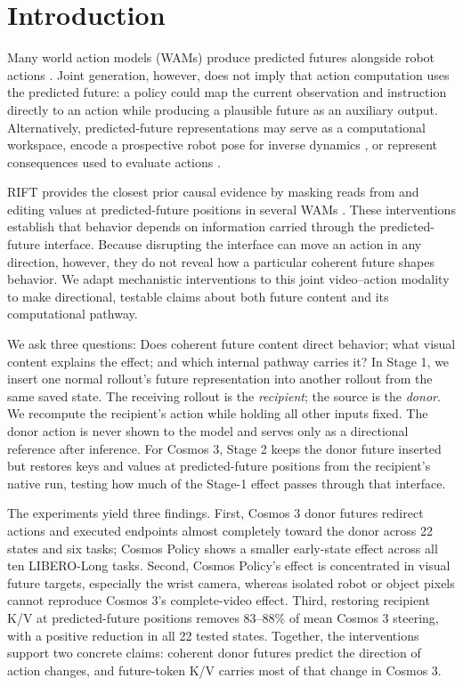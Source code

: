 \section{Introduction}
\label{sec:introduction}

Many world action models (WAMs) produce predicted futures alongside robot actions \citep{kim2026cosmospolicy,nvidia2026cosmos3}. Joint generation, however, does not imply that action computation uses the predicted future: a policy could map the current observation and instruction directly to an action while producing a plausible future as an auxiliary output. Alternatively, predicted-future representations may serve as a computational workspace, encode a prospective robot pose for inverse dynamics \citep{hu2025vpp,du2023unipi}, or represent consequences used to evaluate actions \citep{ebert2018visualforesight,du2024videolanguage}.

RIFT provides the closest prior causal evidence by masking reads from and editing values at predicted-future positions in several WAMs \citep{zhang2026rift}. These interventions establish that behavior depends on information carried through the predicted-future interface. Because disrupting the interface can move an action in any direction, however, they do not reveal how a particular coherent future shapes behavior. We adapt mechanistic interventions to this joint video--action modality to make directional, testable claims about both future content and its computational pathway.

We ask three questions: Does coherent future content direct behavior; what visual content explains the effect; and which internal pathway carries it? In Stage 1, we insert one normal rollout's future representation into another rollout from the same saved state. The receiving rollout is the \emph{recipient}; the source is the \emph{donor}. We recompute the recipient's action while holding all other inputs fixed. The donor action is never shown to the model and serves only as a directional reference after inference. For Cosmos 3, Stage 2 keeps the donor future inserted but restores keys and values at predicted-future positions from the recipient's native run, testing how much of the Stage-1 effect passes through that interface.

The experiments yield three findings. First, Cosmos 3 donor futures redirect actions and executed endpoints almost completely toward the donor across 22 states and six tasks; Cosmos Policy shows a smaller early-state effect across all ten LIBERO-Long tasks. Second, Cosmos Policy's effect is concentrated in visual future targets, especially the wrist camera, whereas isolated robot or object pixels cannot reproduce Cosmos 3's complete-video effect. Third, restoring recipient K/V at predicted-future positions removes 83--88\% of mean Cosmos 3 steering, with a positive reduction in all 22 tested states. Together, the interventions support two concrete claims: coherent donor futures predict the direction of action changes, and future-token K/V carries most of that change in Cosmos 3.

